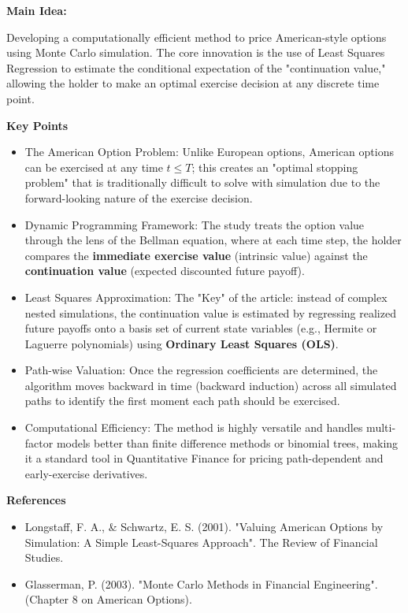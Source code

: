 \documentclass[12pt,a4paper]{article}
\begin{document}
\textbf{Main Idea:}

Developing a computationally efficient method to price American-style options using Monte Carlo simulation. The core innovation is the use of Least Squares Regression to estimate the conditional expectation of the "continuation value," allowing the holder to make an optimal exercise decision at any discrete time point.

\medskip
\textbf{Key Points}
\begin{itemize}
	\item The American Option Problem: Unlike European options, American options can be exercised at any time $t \leq T$; this creates an "optimal stopping problem" that is traditionally difficult to solve with simulation due to the forward-looking nature of the exercise decision.
	
	\item Dynamic Programming Framework: The study treats the option value through the lens of the Bellman equation, where at each time step, the holder compares the \textbf{immediate exercise value} (intrinsic value) against the \textbf{continuation value} (expected discounted future payoff).
	
	\item Least Squares Approximation: The "Key" of the article: instead of complex nested simulations, the continuation value is estimated by regressing realized future payoffs onto a basis set of current state variables (e.g., Hermite or Laguerre polynomials) using \textbf{Ordinary Least Squares (OLS)}.
	
	\item Path-wise Valuation: Once the regression coefficients are determined, the algorithm moves backward in time (backward induction) across all simulated paths to identify the first moment each path should be exercised.
	
	\item Computational Efficiency: The method is highly versatile and handles multi-factor models better than finite difference methods or binomial trees, making it a standard tool in Quantitative Finance for pricing path-dependent and early-exercise derivatives.
	
\end{itemize}
\medskip
\textbf{References}
\begin{itemize}
	\item[-] Longstaff, F. A., \& Schwartz, E. S. (2001). "Valuing American Options by Simulation: A Simple Least-Squares Approach". The Review of Financial Studies.
	\item[-] Glasserman, P. (2003). "Monte Carlo Methods in Financial Engineering". (Chapter 8 on American Options).
\end{itemize}
\end{document}
